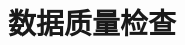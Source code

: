 \documentclass[11pt,compress,xcolor=x11names,UTF8]{beamer}
\begin{document}
\section{数据质量检查}
%
\end{document}
